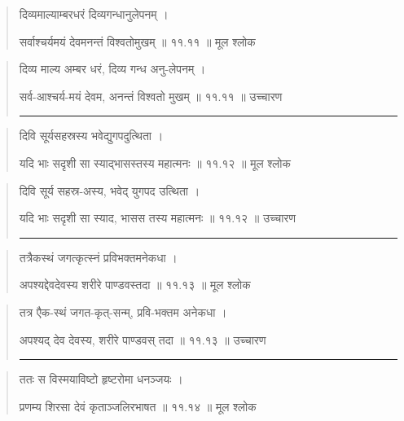 \begin{quotation} 
दिव्यमाल्याम्बरधरं दिव्यगन्धानुलेपनम्‌  ।  

सर्वाश्चर्यमयं देवमनन्तं विश्वतोमुखम्‌  ॥ ११.११ ॥  मूल श्लोक
\end{quotation}

\begin{quotation}

दिव्य माल्य अम्बर धरं, दिव्य गन्ध अनु-लेपनम्‌  ।  

सर्व-आश्चर्य-मयं देवम, अनन्तं विश्वतो मुखम्‌  ॥ ११.११ ॥  उच्चारण

\noindent\rule{16cm}{0.4pt} 
\end{quotation}


\begin{quotation} 

दिवि सूर्यसहस्रस्य भवेद्युगपदुत्थिता  ।  

यदि भाः सदृशी सा स्याद्भासस्तस्य महात्मनः  ॥ ११.१२ ॥  मूल श्लोक
\end{quotation}

\begin{quotation}

दिवि सूर्य सहस्र-अस्य, भवेद् युगपद उत्थिता  ।  

यदि भाः सदृशी सा स्याद, भासस तस्य महात्मनः  ॥ ११.१२ ॥  उच्चारण

\noindent\rule{16cm}{0.4pt} 
\end{quotation}


\begin{quotation} 

तत्रैकस्थं जगत्कृत्स्नं प्रविभक्तमनेकधा  ।  

अपश्यद्देवदेवस्य शरीरे पाण्डवस्तदा  ॥ ११.१३ ॥  मूल श्लोक
\end{quotation}

\begin{quotation}

तत्र एैक-स्थं जगत-कृत्-सन्म्, प्रवि-भक्तम अनेकधा  ।  

अपश्यद् देव देवस्य, शरीरे पाण्डवस् तदा  ॥ ११.१३ ॥  उच्चारण

\noindent\rule{16cm}{0.4pt} 
\end{quotation}


\begin{quotation} 

ततः स विस्मयाविष्टो हृष्टरोमा धनञ्जयः  ।  

प्रणम्य शिरसा देवं कृताञ्जलिरभाषत  ॥ ११.१४ ॥  मूल श्लोक
\end{quotation}

